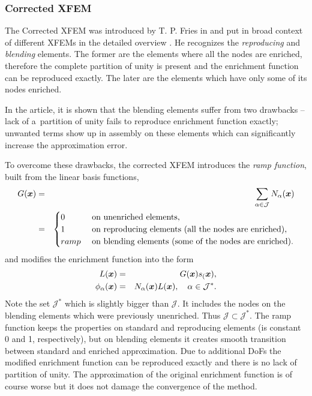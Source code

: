 \subsubsection{Corrected XFEM} \label{sec:corrected_xfem}
The Corrected XFEM was introduced by T. P. Fries in \cite{fries_corrected_2008} and put in broad context of different XFEMs in the detailed overview \cite{fries_xfem_overview_2010}.
He recognizes the \emph{reproducing} and \emph{blending} elements.
The former are the elements where all the nodes are enriched, therefore the complete partition of unity is present
and the enrichment function can be reproduced exactly. The later are the elements which have only some of its nodes enriched.

In the article, it is shown that the blending elements suffer from two drawbacks -- lack of a~partition of unity fails to reproduce enrichment function exactly;
unwanted terms show up in assembly on these elements which can significantly increase the approximation error.
 
To overcome these drawbacks, the corrected XFEM introduces the \emph{ramp function}, built from the linear basis functions,
\begin{eqnarray} \label{eqn:ramp_function}
  G(\mathbf{\boldsymbol{x}}) &=& \sum_{\alpha\in\mathcal{J}} N_\alpha(\mathbf{\boldsymbol{x}})    \\
  &=& 
  \begin{cases}
    0 & \textrm{ on unenriched elements,}    \\
    1 & \textrm{ on reproducing elements (all the nodes are enriched),}    \\
    ramp & \textrm{ on blending elements (some of the nodes are enriched).}    \\
  \end{cases} \nonumber
\end{eqnarray}
and modifies the enrichment function into the form
\begin{eqnarray} \label{eqn:xfem_ramp}
    L(\mathbf{\boldsymbol{x}}) &=& G(\mathbf{\boldsymbol{x}}) s_(\mathbf{\boldsymbol{x}}),\\
    \phi_{\alpha}(\mathbf{\boldsymbol{x}}) &=& N_\alpha(\mathbf{\boldsymbol{x}})L(\mathbf{\boldsymbol{x}}), \quad \alpha\in\mathcal{J}^*.
\end{eqnarray}
Note the set $\mathcal{J}^*$ which is slightly bigger than $\mathcal{J}$. It includes the nodes on the blending
elements which were previously unenriched. Thus $\mathcal{J}\subset\mathcal{J}^*$.
The ramp function keeps the properties on standard and reproducing elements (is constant 0 and 1, respectively),
but on blending elements it creates smooth transition between standard and enriched approximation. Due to
additional DoFs the modified enrichment function can be reproduced exactly and there is no lack of partition of unity.
The approximation of the original enrichment function is of course worse but it does not damage the convergence of the method.


